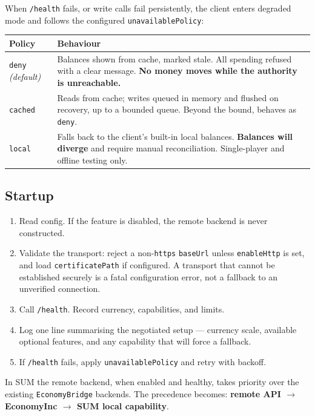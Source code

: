 \documentclass[11pt,a4paper]{article}
\newcommand{\code}[1]{\texttt{\small #1}}
\begin{document}
When \code{/health} fails, or write calls fail persistently, the client enters degraded mode and
follows the configured \code{unavailablePolicy}:

\begin{tabularx}{\linewidth}{L{2.6cm} X}
\toprule
\textbf{Policy} & \textbf{Behaviour}\\
\midrule
\code{deny} \emph{(default)} & Balances shown from cache, marked stale. All spending refused with a
  clear message. \textbf{No money moves while the authority is unreachable.}\\
\code{cached} & Reads from cache; writes queued in memory and flushed on recovery, up to a bounded
  queue. Beyond the bound, behaves as \code{deny}.\\
\code{local}  & Falls back to the client's built-in local balances. \textbf{Balances will diverge}
  and require manual reconciliation. Single-player and offline testing only.\\
\bottomrule
\end{tabularx}

\subsection{Startup}

\begin{enumerate}
\item Read config. If the feature is disabled, the remote backend is never constructed.
\item Validate the transport: reject a non-\code{https} \code{baseUrl} unless \code{enableHttp} is
      set, and load \code{certificatePath} if configured. A transport that cannot be established
      securely is a fatal configuration error, not a fallback to an unverified connection.
\item Call \code{/health}. Record currency, capabilities, and limits.
\item Log one line summarising the negotiated setup --- currency scale, available optional features,
      and any capability that will force a fallback.
\item If \code{/health} fails, apply \code{unavailablePolicy} and retry with backoff.
\end{enumerate}

In SUM the remote backend, when enabled and healthy, takes priority over the existing
\code{EconomyBridge} backends. The precedence becomes:
\textbf{remote API $\to$ EconomyInc $\to$ SUM local capability}.
\end{document}

